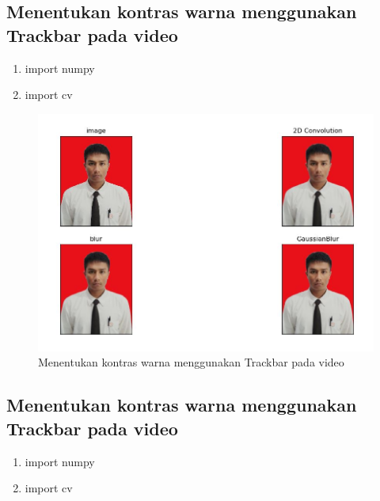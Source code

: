 \newpage
\subsection{Menentukan kontras warna menggunakan Trackbar pada video}

\begin{enumerate}
	\item import numpy
	\item import cv
\end{enumerate}

\newpage
\begin{figure}[ht]
\centering
\includegraphics[scale=0.5]{figures/2,61.jpg}
\caption{Menentukan kontras warna menggunakan Trackbar pada video}
\label{contoh}
\end{figure}







\newpage
\subsection{Menentukan kontras warna menggunakan Trackbar pada video}

\begin{enumerate}
	\item import numpy
	\item import cv
\end{enumerate}

